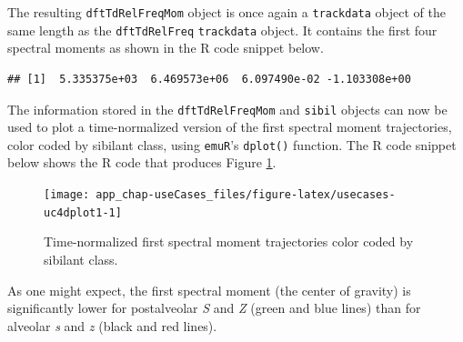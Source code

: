 \documentclass[]{book}
\newenvironment{Shaded}{\begin{snugshade}}{\end{snugshade}}
\newcommand{\CommentTok}[1]{\textcolor[rgb]{0.56,0.35,0.01}{\textit{#1}}}
\newcommand{\DataTypeTok}[1]{\textcolor[rgb]{0.13,0.29,0.53}{#1}}
\newcommand{\DecValTok}[1]{\textcolor[rgb]{0.00,0.00,0.81}{#1}}
\newcommand{\KeywordTok}[1]{\textcolor[rgb]{0.13,0.29,0.53}{\textbf{#1}}}
\newcommand{\NormalTok}[1]{#1}
\newcommand{\OperatorTok}[1]{\textcolor[rgb]{0.81,0.36,0.00}{\textbf{#1}}}
\newcommand{\OtherTok}[1]{\textcolor[rgb]{0.56,0.35,0.01}{#1}}
\newcommand{\StringTok}[1]{\textcolor[rgb]{0.31,0.60,0.02}{#1}}
\theoremstyle{definition}
\theoremstyle{definition}
\theoremstyle{definition}
\theoremstyle{remark}
\begin{document}
The resulting \texttt{dftTdRelFreqMom} object is once again a
\texttt{trackdata} object of the same length as the
\texttt{dftTdRelFreq} \texttt{trackdata} object. It contains the first
four spectral moments as shown in the R code snippet below.

\begin{Shaded}
\end{Shaded}

\begin{verbatim}
## [1]  5.335375e+03  6.469573e+06  6.097490e-02 -1.103308e+00
\end{verbatim}

The information stored in the \texttt{dftTdRelFreqMom} and
\texttt{sibil} objects can now be used to plot a time-normalized version
of the first spectral moment trajectories, color coded by sibilant
class, using \texttt{emuR}'s \texttt{dplot()} function. The R code
snippet below shows the R code that produces Figure
\ref{fig:usecases-uc4dplot1}.

\begin{Shaded}
\end{Shaded}

\begin{figure}

{\centering \texttt{[image: app\_chap-useCases\_files/figure-latex/usecases-uc4dplot1-1]} 

}

\caption{Time-normalized first spectral moment trajectories color coded by sibilant class.}\label{fig:usecases-uc4dplot1}
\end{figure}

As one might expect, the first spectral moment (the center of gravity)
is significantly lower for postalveolar \emph{S} and \emph{Z} (green and
blue lines) than for alveolar \emph{s} and \emph{z} (black and red
lines).
\end{document}

